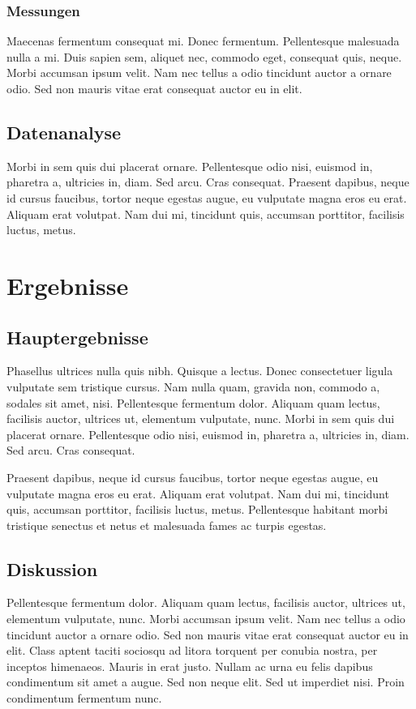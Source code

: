 \documentclass[twocolumn]{article}
\begin{document}
\subsubsection{Messungen}
Maecenas fermentum consequat mi. Donec fermentum. Pellentesque malesuada nulla a mi. Duis sapien sem, aliquet nec, commodo eget, consequat quis, neque. Morbi accumsan ipsum velit. Nam nec tellus a odio tincidunt auctor a ornare odio. Sed non mauris vitae erat consequat auctor eu in elit.

\subsection{Datenanalyse}
Morbi in sem quis dui placerat ornare. Pellentesque odio nisi, euismod in, pharetra a, ultricies in, diam. Sed arcu. Cras consequat. Praesent dapibus, neque id cursus faucibus, tortor neque egestas augue, eu vulputate magna eros eu erat. Aliquam erat volutpat. Nam dui mi, tincidunt quis, accumsan porttitor, facilisis luctus, metus.


\section{Ergebnisse}
\subsection{Hauptergebnisse}
Phasellus ultrices nulla quis nibh. Quisque a lectus. Donec consectetuer ligula vulputate sem tristique cursus. Nam nulla quam, gravida non, commodo a, sodales sit amet, nisi. Pellentesque fermentum dolor. Aliquam quam lectus, facilisis auctor, ultrices ut, elementum vulputate, nunc. Morbi in sem quis dui placerat ornare. Pellentesque odio nisi, euismod in, pharetra a, ultricies in, diam. Sed arcu. Cras consequat.

Praesent dapibus, neque id cursus faucibus, tortor neque egestas augue, eu vulputate magna eros eu erat. Aliquam erat volutpat. Nam dui mi, tincidunt quis, accumsan porttitor, facilisis luctus, metus. Pellentesque habitant morbi tristique senectus et netus et malesuada fames ac turpis egestas.

\subsection{Diskussion}
Pellentesque fermentum dolor. Aliquam quam lectus, facilisis auctor, ultrices ut, elementum vulputate, nunc. Morbi accumsan ipsum velit. Nam nec tellus a odio tincidunt auctor a ornare odio. Sed non mauris vitae erat consequat auctor eu in elit. Class aptent taciti sociosqu ad litora torquent per conubia nostra, per inceptos himenaeos. Mauris in erat justo. Nullam ac urna eu felis dapibus condimentum sit amet a augue. Sed non neque elit. Sed ut imperdiet nisi. Proin condimentum fermentum nunc.
\end{document}

